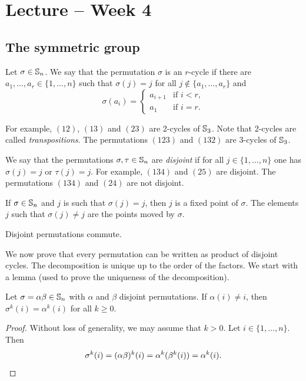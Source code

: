 \section{Lecture -- Week 4}

\subsection{The symmetric group}

Let $\sigma\in\mathbb{S}_n$. We say that the permutation $\sigma$ is an $r$-cycle 
if there are $a_1,\dots,a_r\in\{1,\dots,n\}$ such that 
$\sigma(j)=j$ for all $j\not\in\{a_1,\dots,a_r\}$ and 
\[
\sigma(a_i)=\begin{cases}
a_{i+1} & \text{if $i<r$},\\
a_1 & \text{if $i=r$}.
\end{cases}
\]

For example, $(12)$, $(13)$ and $(23)$ are 2-cycles of 
$\mathbb{S}_3$. Note that 
2-cycles are called \emph{transpositions}.
The permutations $(123)$ and $(132)$ are 3-cycles of $\mathbb{S}_3$.

We say that the permutations $\sigma,\tau\in\mathbb{S}_n$ 
are \emph{disjoint} if for all 
$j\in\{1,\dots,n\}$
one has $\sigma(j)=j$ or $\tau(j)=j$. For example, 
$(134)$ and $(25)$ are disjoint. The permutations $(134)$ and 
$(24)$ are not disjoint. 

If $\sigma\in\mathbb{S}_n$ and $j$ is such that 
$\sigma(j)=j$, then $j$ is a fixed point of $\sigma$. The elements 
$j$ such that 
$\sigma(j)\ne j$ are the points moved by 
$\sigma$.

\begin{claim}
Disjoint permutations commute. 
\end{claim}


We now prove that every permutation can be written 
as product of disjoint cycles. 
The decomposition is unique up to the order of the factors. 
We start with a lemma (used to prove the uniqueness of the decomposition).

\begin{lemma}
        Let $\sigma=\alpha\beta\in\mathbb{S}_n$ with $\alpha$ and $\beta$ disjoint permutations. If $\alpha(
i)\ne i$, then $\sigma^k(i)=\alpha^k(i)$ for all $k\geq0$.
\end{lemma}

\begin{proof}
    Without loss of generality, we may assume that $k>0$. 
    Let $i\in\{1,\dots,n\}$. Then \[
    \sigma^k(i)=(\alpha\beta)^k(i)=\alpha^k(\beta^k(i))=\alpha^k(i).\qedhere
    \]
\end{proof}

